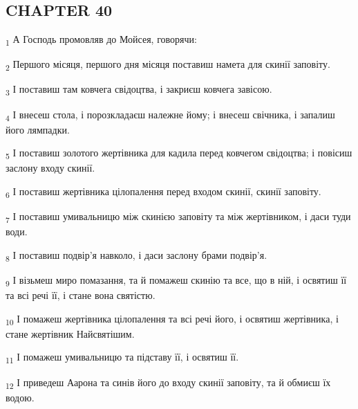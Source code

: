 \subsection{CHAPTER 40}
\begin{tcolorbox}
\textsubscript{1} А Господь промовляв до Мойсея, говорячи:
\end{tcolorbox}
\begin{tcolorbox}
\textsubscript{2} Першого місяця, першого дня місяця поставиш намета для скинії заповіту.
\end{tcolorbox}
\begin{tcolorbox}
\textsubscript{3} І поставиш там ковчега свідоцтва, і закриєш ковчега завісою.
\end{tcolorbox}
\begin{tcolorbox}
\textsubscript{4} І внесеш стола, і порозкладаєш належне йому; і внесеш свічника, і запалиш його лямпадки.
\end{tcolorbox}
\begin{tcolorbox}
\textsubscript{5} І поставиш золотого жертівника для кадила перед ковчегом свідоцтва; і повісиш заслону входу скинії.
\end{tcolorbox}
\begin{tcolorbox}
\textsubscript{6} І поставиш жертівника цілопалення перед входом скинії, скинії заповіту.
\end{tcolorbox}
\begin{tcolorbox}
\textsubscript{7} І поставиш умивальницю між скинією заповіту та між жертівником, і даси туди води.
\end{tcolorbox}
\begin{tcolorbox}
\textsubscript{8} І поставиш подвір'я навколо, і даси заслону брами подвір'я.
\end{tcolorbox}
\begin{tcolorbox}
\textsubscript{9} І візьмеш миро помазання, та й помажеш скинію та все, що в ній, і освятиш її та всі речі її, і стане вона святістю.
\end{tcolorbox}
\begin{tcolorbox}
\textsubscript{10} І помажеш жертівника цілопалення та всі речі його, і освятиш жертівника, і стане жертівник Найсвятішим.
\end{tcolorbox}
\begin{tcolorbox}
\textsubscript{11} І помажеш умивальницю та підставу її, і освятиш її.
\end{tcolorbox}
\begin{tcolorbox}
\textsubscript{12} І приведеш Аарона та синів його до входу скинії заповіту, та й обмиєш їх водою.
\end{tcolorbox}
